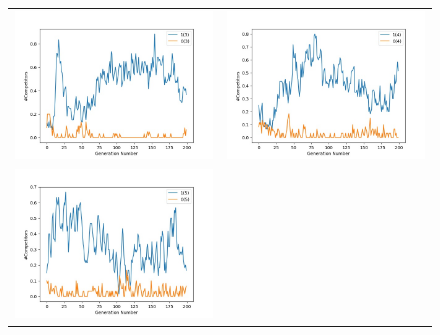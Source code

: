 \documentclass{article}
\begin{document}
\begin{figure}[H]
\begin{adjustbox}{width=0.6\paperwidth}
\begin{tabular}{c c}
				\includegraphics{Codes/Problem_1 Construction_2/Comp_3.jpg}&
				\includegraphics{Codes/Problem_1 Construction_2/Comp_4.jpg} \\ \includegraphics{Codes/Problem_1 Construction_2/Comp_5.jpg} &

\end{tabular}
\end{adjustbox}
\end{figure}
\end{document}
